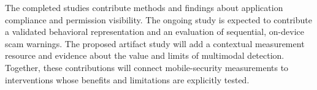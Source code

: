 \documentclass[letterpaper,11pt]{article}
\begin{document}
The completed studies contribute methods and findings about application compliance
and permission visibility. The ongoing study is expected to contribute a validated
behavioral representation and an evaluation of sequential, on-device scam
warnings. The proposed artifact study will add a contextual measurement resource
and evidence about the value and limits of multimodal detection. Together, these
contributions will connect mobile-security measurements to interventions whose
benefits and limitations are explicitly tested.

{\footnotesize}
\end{document}
